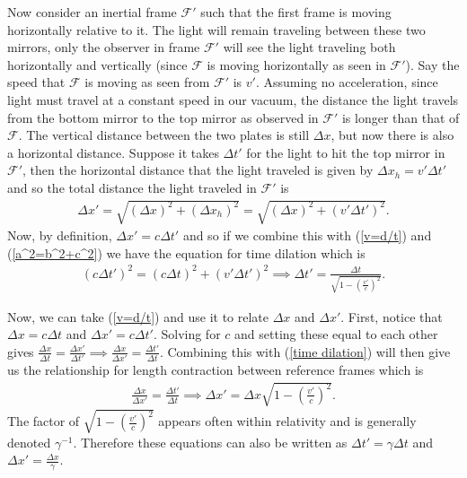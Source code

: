 \documentclass[11pt]{article}
\theoremstyle{definition}
\begin{document}
Now consider an inertial frame $\mathcal{F}'$ such that the first frame is moving horizontally relative to it. The light will remain traveling between these two mirrors, only the observer in frame $\mathcal{F}'$ will see the light traveling both horizontally and vertically (since $\mathcal{F}$ is moving horizontally as seen in $\mathcal{F}'$). Say the speed that $\mathcal{F}$ is moving as seen from $\mathcal{F}'$ is $v'$. Assuming no acceleration, since light must travel at a constant speed in our vacuum, the distance the light travels from the bottom mirror to the top mirror as observed in $\mathcal{F}'$ is longer than that of $\mathcal{F}$. The vertical distance between the two plates is still $\Delta x$, but now there is also a horizontal distance. Suppose it takes $\Delta t'$ for the light to hit the top mirror in $\mathcal{F}'$, then the horizontal distance that the light traveled is given by $\Delta x_h = v' \Delta t'$ and so the total distance the light traveled in $\mathcal{F}'$ is 
\begin{align}
\Delta x' =\sqrt{(\Delta x)^2 + (\Delta x_h)^2}=\sqrt{(\Delta x)^2 + (v' \Delta t')^2}. \label{a^2=b^2+c^2}
\end{align}
Now, by definition, $\Delta x' = c \Delta t'$ and so if we combine this with (\ref{v=d/t}) and (\ref{a^2=b^2+c^2}) we have the equation for time dilation which is
\begin{align}
(c \Delta t')^2=(c \Delta t)^2 + (v' \Delta t')^2 \implies \Delta t'=\frac{\Delta t}{\sqrt{1-\left(\frac{v'}{c}\right)^2}} \label{time dilation}.
\end{align}

Now, we can take (\ref{v=d/t}) and use it to relate $\Delta x$ and $\Delta x'$. First, notice that $\Delta x = c \Delta t$ and $\Delta x' = c \Delta t'$. Solving for $c$ and setting these equal to each other gives $\frac{\Delta x}{\Delta t} = \frac{\Delta x'}{\Delta t'} \implies \frac{\Delta x}{\Delta x'} = \frac{\Delta t'}{\Delta t}$. Combining this with (\ref{time dilation}) will then give us the relationship for length contraction between reference frames which is
\begin{align}
\frac{\Delta x}{\Delta x'} = \frac{\Delta t'}{\Delta t} \implies \Delta x' = \Delta x \sqrt{1-\left(\frac{v'}{c}\right)^2}. \label{lengthContraction}
\end{align}
The factor of $\sqrt{1-\left(\frac{v'}{c}\right)^2}$ appears often within relativity and is generally denoted $\gamma^{-1}$. Therefore these equations can also be written as $\Delta t'=\gamma \Delta t$ and $\Delta x'=\frac{ \Delta x}{\gamma}$. 
\end{document}

